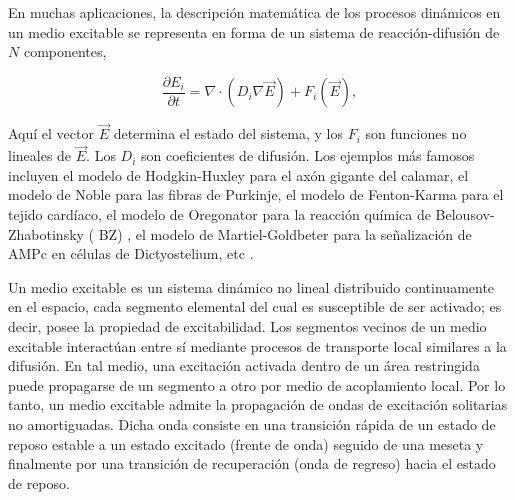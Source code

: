 En muchas aplicaciones, la descripción matemática de los procesos dinámicos en un medio excitable se representa en forma de un sistema de reacción-difusión de $N$ componentes,


\begin{equation}\label{eq:54}
	\frac{\partial E_i}{\partial t} = \nabla \cdot \left(D_i\nabla\vec{E}\right) + F_i \left(\vec{E}\right),
\end{equation}

Aquí el vector $\vec{E}$ determina el estado del sistema, y los $F_i$ son funciones no lineales de $\vec{E}$. Los $D_i$ son coeficientes de difusión. Los ejemplos más famosos incluyen el modelo de Hodgkin-Huxley para el axón gigante del calamar, el modelo de Noble para las fibras de Purkinje, el modelo de Fenton-Karma para el tejido cardíaco, el modelo de Oregonator para la reacción química de  Belousov-Zhabotinsky ( BZ) , el modelo de Martiel-Goldbeter para la señalización de AMPc en células de Dictyostelium, etc \cite{zykov_wave_2018}.

Un medio excitable es un sistema dinámico no lineal distribuido continuamente en el espacio, cada segmento elemental del cual es susceptible de ser activado; es decir, posee la propiedad de excitabilidad. Los segmentos vecinos de un medio excitable interactúan entre sí mediante procesos de transporte local similares a la difusión. En tal medio, una excitación activada dentro de un área restringida puede propagarse de un segmento a otro por medio de acoplamiento local. Por lo tanto, un medio excitable admite la propagación de ondas de excitación solitarias no amortiguadas. Dicha onda consiste en una transición rápida de un estado de reposo estable a un estado excitado (frente de onda) seguido de una meseta y finalmente por una transición de recuperación (onda de regreso) hacia el estado de reposo.


